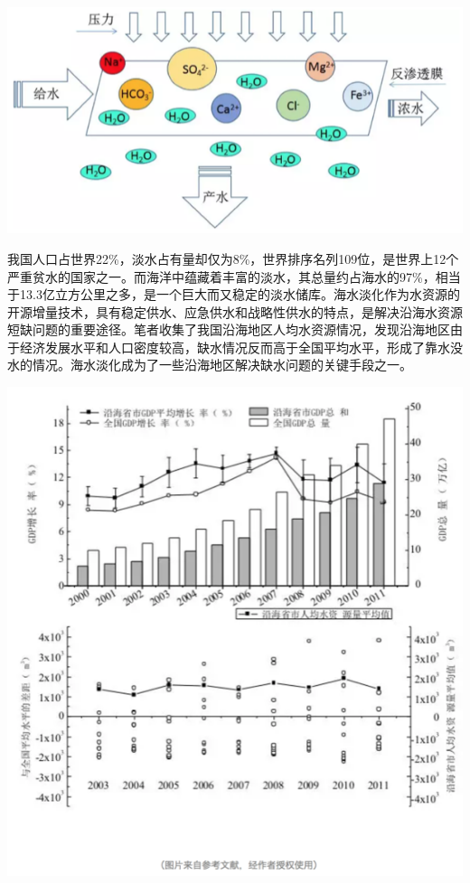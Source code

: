 \documentclass[]{book}
\begin{document}
\includegraphics[width=8.33in]{images/seawater2}

我国人口占世界22\%，淡水占有量却仅为8\%，世界排序名列109位，是世界上12个严重贫水的国家之一。而海洋中蕴藏着丰富的淡水，其总量约占海水的97\%，相当于13.3亿立方公里之多，是一个巨大而又稳定的淡水储库。海水淡化作为水资源的开源增量技术，具有稳定供水、应急供水和战略性供水的特点，是解决沿海水资源短缺问题的重要途径。笔者收集了我国沿海地区人均水资源情况，发现沿海地区由于经济发展水平和人口密度较高，缺水情况反而高于全国平均水平，形成了靠水没水的情况。海水淡化成为了一些沿海地区解决缺水问题的关键手段之一。

\includegraphics[width=7.76in]{images/seawater3}
\end{document}
